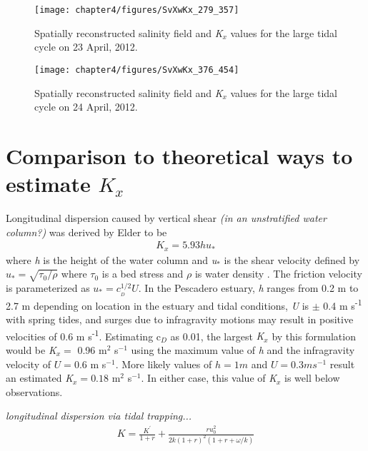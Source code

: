 \begin{figure}[hp]
\centering
	\texttt{[image: chapter4/figures/SvXwKx\_279\_357]} 
\caption{Spatially reconstructed salinity field and \emph{K$_x$} values for the large tidal cycle on 23 April, 2012. } \label{fig:Kx423}
\end{figure}

\begin{figure}[hp]
\centering
	\texttt{[image: chapter4/figures/SvXwKx\_376\_454]} 
\caption{Spatially reconstructed salinity field and \emph{K$_x$} values for the large tidal cycle on 24 April, 2012.} \label{fig:Kx424}
\end{figure}




\section{Comparison to theoretical ways to estimate $K_x$}

Longitudinal dispersion caused by vertical shear \emph{(in an unstratified water column?)} was derived by Elder to be
\begin{eqnarray}
K_x = 5.93hu_* \label{eq:Kshear}
\end{eqnarray}
where \emph{h} is the height of the water column and \emph{u$_*$} is the shear velocity defined by $u_*=\sqrt{\tau_0/\rho}$ where $\tau_0$ is a bed stress and $\rho$ is water density \parencite*{elder_dispersion_1959}. The friction velocity is parameterized as $u_* = c_{_D}^{1/2}U$. In the Pescadero estuary, \emph{h} ranges from 0.2 m to 2.7 m depending on location in the estuary and tidal conditions, \emph{U} is $\pm$ 0.4 m s\textsuperscript{-1} with spring tides, and surges due to infragravity motions may result in positive velocities of 0.6 m s\textsuperscript{-1}. Estimating c$_D$ as 0.01, the largest \emph{K$_x$} by this formulation would be \emph{K}$_x =$ 0.96 m$^2$ s$^{-1}$ using the maximum value of \emph{h} and the infragravity velocity of $U = 0.6$ m s$^{-1}$. More likely values of $h = 1 m$ and $U = 0.3 m s^{-1}$ result an estimated \emph{K}$_x = 0.18$ m$^2$ s$^{-1}$. In either case, this value of \emph{K$_x$} is well below observations.

\emph{longitudinal dispersion via tidal trapping...}
\begin{eqnarray}
K = \frac{K^{'}}{1+r} + \frac{ru_0^2}{2k(1+r)^2(1+r+\omega / k)} \label{eq:KxOkubo}
\end{eqnarray}

